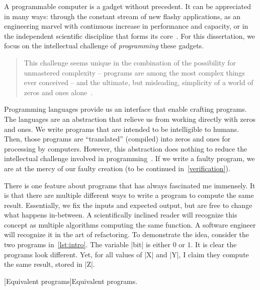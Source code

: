 A programmable computer is a gadget without precedent.
It can be appreciated in many ways: %
through the constant stream of new flashy applications,
as an engineering marvel with continuous increase in performance and capacity,
or in the independent scientific discipline that forms its core~\cite{dijkstra1979a,hoare2006}.
For this dissertation, we focus on the intellectual challenge of \emph{programming} these gadgets.
\begin{quotation}
\noindent This challenge seems unique in the combination of the possibility for unmastered complexity -- programs are among the most
complex things ever conceived -- and the ultimate, but misleading, simplicity of a world of zeros and ones alone~\cite{dijkstra1979a}.
\end{quotation}

{Programming languages} provide us an interface that enable crafting programs.
The languages are an abstraction that relieve us from working directly with zeros and ones.
We write programs that are intended to be intelligible to humans.
Then, those programs are \enquote{translated} (compiled) into zeros and ones for processing by computers.
However, this abstraction does nothing to reduce the intellectual challenge involved in programming~\cite{dijkstra1979b}.
If we write a faulty program, we are at the mercy of our faulty creation (to be continued in~\autoref{verification}).

There is one feature about programs that has always fascinated me immensely.
It is that there are {multiple different ways} to write a program to compute the {same result}.
Essentially, we fix the inputs and expected output, but are free to change what happens in-between.
A scientifically inclined reader will recognize this concept as multiple algorithms computing the same function.
A software engineer will recognize it in the art of refactoring.
To demonstrate the idea, consider the two programs in~\autoref{lst:intro}.
The variable \pr|bit| is either \(0\) or \(1\).
It is clear the programs look different.
Yet, for all values of \pr|X| and \pr|Y|, I claim they compute the same result, stored in \pr|Z|.

\begin{center}
\captionsetup{type=lstlisting}
\begin{minipage}{.3\textwidth}

\end{minipage}%
\hspace{3em}%
\begin{minipage}{.4\textwidth}
\captionsetup{type=lstlisting}

\end{minipage}
[Equivalent programs]{Equivalent programs.}
\label{lst:intro}
\end{center}

